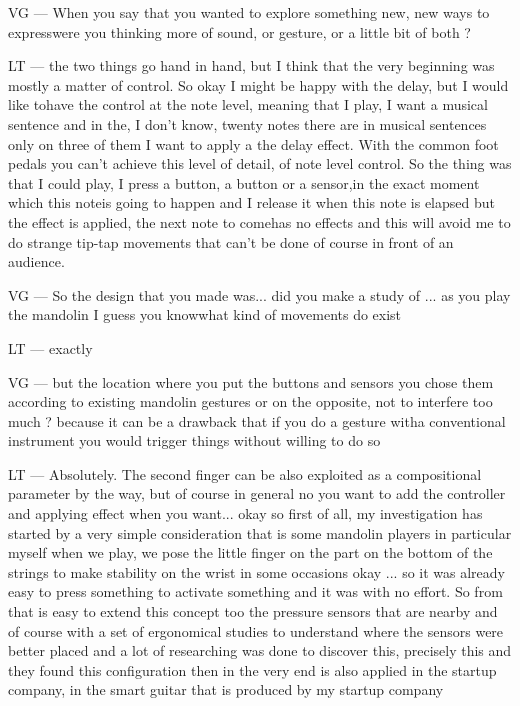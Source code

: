 VG — When you say that you wanted to explore something new, new ways to expresswere you thinking more of sound, or gesture, or a little bit of both ?

LT — the two things go hand in hand, but I think that the very beginning was mostly a matter of control. So okay I might be happy with the delay, but I would like tohave the control at the note level, meaning that I play, I want a musical sentence and in the, I don't know, twenty notes there are in musical sentences only on three of them I want to apply a the delay effect. With the common foot pedals you can't achieve this level of detail, of note level control. So the thing was that I could play, I press a button, a button or a sensor,in the exact moment which this noteis going to happen and I release it when this note is elapsed but the effect is applied, the next note to comehas no effects and this will avoid me to do strange tip-tap movements that can't be done of course in front of an audience.

VG — So the design that you made was... did you make a study of ... as you play the mandolin I guess you knowwhat kind of movements do exist 

LT — exactly

VG — but the location where you put the buttons and sensors you chose them according to existing mandolin gestures or on the opposite, not to interfere too much ? because it can be a drawback that if you do a gesture witha conventional instrument you would trigger things without willing to do so

LT — Absolutely. The second finger can be also exploited as a compositional parameter by the way, but of course in general no you want to add the controller and applying effect when you want... okay so first of all, my investigation has started by a very simple consideration that is some mandolin players in particular myself when we play, we pose the little finger on the part on the bottom of the strings to make stability on the wrist in some occasions okay ... so it was already easy to press something to activate something and it was with no effort. So from that is easy to extend this concept too the pressure sensors that are nearby and of course with a set of ergonomical studies to understand where the sensors were better placed and a lot of researching was done to discover this, precisely this and they found this configuration then in the very end is also applied in the startup company, in the smart guitar that is produced by my startup company

